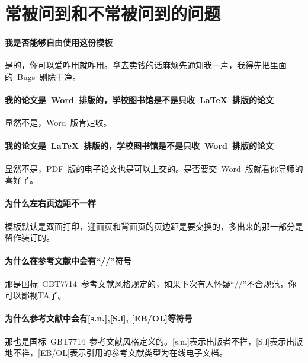 

\chapter{常被问到和不常被问到的问题}
\label{chap:faq}

\subsubsection*{我是否能够自由使用这份模板}
是的，你可以爱咋用就咋用。拿去卖钱的话麻烦先通知我一声，我得先把里面的~Bugs~剔除干净。

\subsubsection*{我的论文是~Word~排版的，学校图书馆是不是只收~\LaTeX~排版的论文}
显然不是，Word~版肯定收。

\subsubsection*{我的论文是~\LaTeX~排版的，学校图书馆是不是只收~Word~排版的论文}
显然不是，PDF~版的电子论文也是可以上交的。是否要交~Word~版就看你导师的喜好了。

\subsubsection*{为什么左右页边距不一样}
模板默认是双面打印，迎面页和背面页的页边距是要交换的，多出来的那一部分是留作装订的。

\subsubsection*{为什么在参考文献中会有``//''符号}
那是国标~GBT7714~参考文献风格规定的，如果下次有人怀疑``//''不合规范，你可以鄙视TA了。

\subsubsection*{为什么参考文献中会有[s.n.],[S.l], [EB/OL]等符号}
那也是国标~GBT7714~参考文献风格定义的。[s.n.]表示出版者不祥，[S.l]表示出版地不祥，[EB/OL]表示引用的参考文献类型为在线电子文档。

